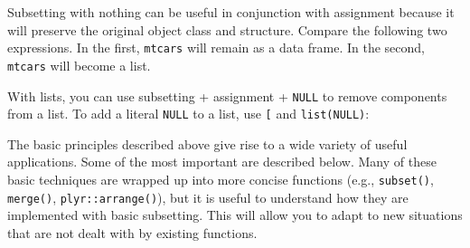 Subsetting with nothing can be useful in conjunction with assignment
because it will preserve the original object class and structure.
Compare the following two expressions. In the first, \texttt{mtcars}
will remain as a data frame. In the second, \texttt{mtcars} will become
a list.

\begin{Shaded}
\begin{Highlighting}[]
\StringTok{ }
\StringTok{ }
\end{Highlighting}
\end{Shaded}

With lists, you can use subsetting + assignment + \texttt{NULL} to
remove components from a list. To add a literal \texttt{NULL} to a list,
use \texttt{{[}} and \texttt{list(NULL)}:

\begin{Shaded}
\begin{Highlighting}[]
\StringTok{ }\NormalTok{(} \NormalTok{, } \NormalTok{)}
\NormalTok{x[[}\NormalTok{]] <-}\StringTok{ }

\StringTok{ }\NormalTok{(} \NormalTok{)}
\NormalTok{y[}\NormalTok{] <-}\StringTok{ }\NormalTok{(}\NormalTok{)}
\end{Highlighting}
\end{Shaded}


The basic principles described above give rise to a wide variety of
useful applications. Some of the most important are described below.
Many of these basic techniques are wrapped up into more concise
functions (e.g., \texttt{subset()}, \texttt{merge()},
\texttt{plyr::arrange()}), but it is useful to understand how they are
implemented with basic subsetting. This will allow you to adapt to new
situations that are not dealt with by existing functions.

